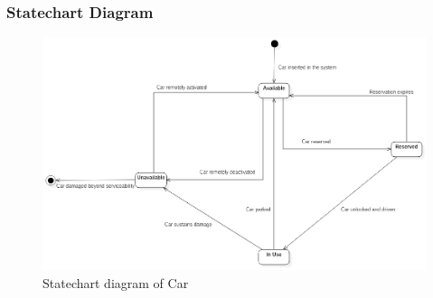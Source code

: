 \clearpage
\subsubsection{Statechart Diagram}
\begin{figure}[h]
\centering
\includegraphics[width=\linewidth,keepaspectratio]{../Diagrams/SCD/SCD_Car.png}
\caption{Statechart diagram of Car}
\end{figure}
\FloatBarrier

